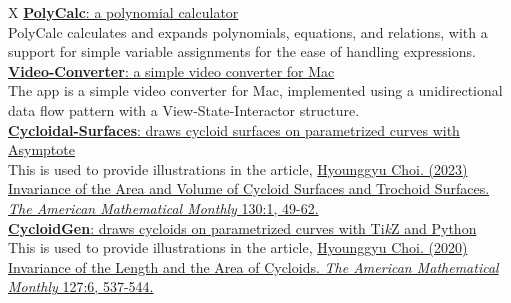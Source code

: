 \documentclass[a4paper,10pt]{memoir}
\begin{document}
\begin{tblr}{X}
  \href{https://github.com/Zeta611/polycalc}{\textbf{PolyCalc}: a polynomial calculator}                                                                                                                                                                                                         \\
  PolyCalc calculates and expands polynomials, equations, and relations, with a support for simple variable assignments for the ease of handling expressions. \\[0.5\onelineskip]

  \href{https://github.com/Zeta611/Video-Converter}{\textbf{Video-Converter}: a simple video converter for Mac}                                                                                                                                                                                \\
  The app is a simple video converter for Mac, implemented using a unidirectional data flow pattern with a View-State-Interactor structure. \\[0.5\onelineskip]

  \href{https://github.com/Zeta611/cycloidal-surfaces}{\textbf{Cycloidal-Surfaces}: draws cycloid surfaces on parametrized curves with Asymptote}                                                                                                                                                             \\
  This is used to provide illustrations in the article, \href{https://www.tandfonline.com/doi/abs/10.1080/00029890.2022.2130677}{Hyounggyu Choi. (2023) Invariance of the Area and Volume of Cycloid Surfaces and Trochoid Surfaces. \textit{The American Mathematical Monthly} 130:1, 49-62.} \\[0.5\onelineskip]

  \href{https://github.com/Zeta611/CycloidGen}{\textbf{CycloidGen}: draws cycloids on parametrized curves with Ti\textit{k}Z and Python}                                                                                                                                                                                     \\
  This is used to provide illustrations in the article, \href{https://www.tandfonline.com/doi/abs/10.1080/00029890.2020.1743611}{Hyounggyu Choi. (2020) Invariance of the Length and the Area of Cycloids. \textit{The American Mathematical Monthly} 127:6, 537-544.} \\[0.5\onelineskip]
\end{tblr}
\end{document}
